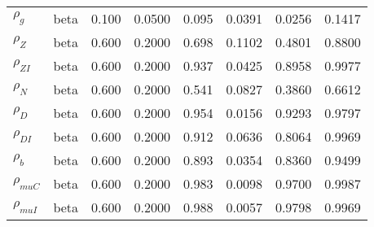 \begin{center}
\begin{longtable}{llcccccc}
${\rho_g}$ & beta &   0.100 & 0.0500 &   0.095& 0.0391 &  0.0256 &  0.1417 \\ 
${\rho_Z}$ & beta &   0.600 & 0.2000 &   0.698& 0.1102 &  0.4801 &  0.8800 \\ 
${\rho_{ZI}}$ & beta &   0.600 & 0.2000 &   0.937& 0.0425 &  0.8958 &  0.9977 \\ 
${\rho_N}$ & beta &   0.600 & 0.2000 &   0.541& 0.0827 &  0.3860 &  0.6612 \\ 
${\rho_D}$ & beta &   0.600 & 0.2000 &   0.954& 0.0156 &  0.9293 &  0.9797 \\ 
${\rho_{DI}}$ & beta &   0.600 & 0.2000 &   0.912& 0.0636 &  0.8064 &  0.9969 \\ 
${\rho_b}$ & beta &   0.600 & 0.2000 &   0.893& 0.0354 &  0.8360 &  0.9499 \\ 
${\rho_{muC}}$ & beta &   0.600 & 0.2000 &   0.983& 0.0098 &  0.9700 &  0.9987 \\ 
${\rho_{muI}}$ & beta &   0.600 & 0.2000 &   0.988& 0.0057 &  0.9798 &  0.9969 \\ 
\end{longtable}
 \end{center}
